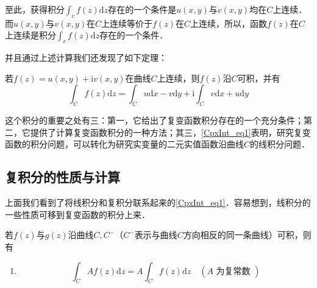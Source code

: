 至此，获得积分$\displaystyle \int_{c} f(z) \mathrm{d} z$存在的一个条件是$u(x, y)$与$v(x, y)$均在$C$上连续．而$u(x, y)$与$v(x, y)$在$C$上连续等价于$ f (z)$在$C$上连续，所以，函数$ f (z)$在$C$上连续是积分$\displaystyle \int_{c} f(z) \mathrm{d} z$存在的一个条件．

并且通过上述计算我们还发现了如下定理：
\begin{theorem}{} 
若$ f (z) = u(x, y) + \mathrm iv(x, y)$在曲线$C$上连续，则$f (z)$沿$C$可积，并有
\begin{equation} \label{CpxInt_eq1}
\int_{C} f(z) \mathrm{d} z=\int_{C} u \mathrm{d} x-v \mathrm{d} y+\mathrm{i} \int_{C} v \mathrm{d} x+u \mathrm{d} y
\end{equation}
\end{theorem}

这个积分的重要之处有三：第一，它给出了复变函数积分存在的一个充分条件；第二，它提供了计算复变函数积分的一种方法；其三，\autoref{CpxInt_eq1}表明，研究复变函数的积分问题，可以转化为研究实变量的二元实值函数沿曲线$C $的线积分问题．

\subsection{复积分的性质与计算}

上面我们看到了将线积分和复积分联系起来的\autoref{CpxInt_eq1}．容易想到，线积分的一些性质可移到复变函数的积分上来．

若$ f (z)$与$g (z)$沿曲线$C,C^-$（$C^-$表示与曲线$C$方向相反的同一条曲线）可积，则有
\begin{enumerate}
\item \begin{equation}
\int_{C} A f(z) \mathrm{d} z=A \int_{C} f(z) \mathrm{d} z \quad(A \text { 为复常数 })
\end{equation}
\end{enumerate}